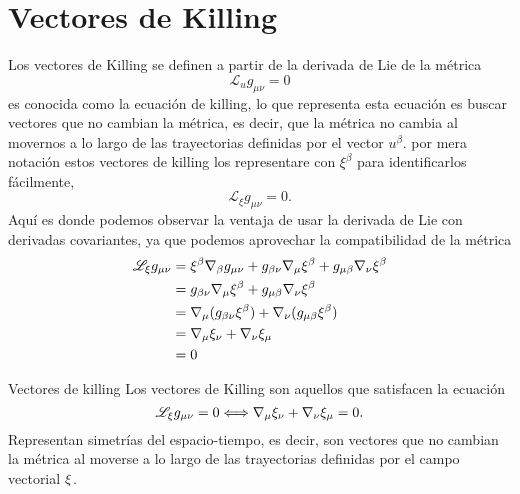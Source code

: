 \section{Vectores de Killing}
\noindent Los vectores de Killing se definen a partir de la derivada de Lie de la métrica
\begin{equation}
    \mathscr{L}_u g_{\mu \nu} =0
\end{equation}
es conocida como la ecuación de killing, lo que representa esta ecuación es buscar vectores que no cambian la métrica, es decir, que la métrica no cambia al movernos a lo largo de las trayectorias definidas por el vector $u^\beta$.
por mera notación estos vectores de killing los representare con $\xi ^\beta$ para identificarlos fácilmente,
\begin{equation}
    \mathscr{L}_\xi g_{\mu \nu} =0.
\end{equation}
Aquí es donde podemos observar la ventaja de usar la derivada de Lie con derivadas covariantes, ya que podemos aprovechar la compatibilidad de la métrica
\begin{equation}
    \begin{aligned}
        \mathscr{L}_\xi g_{\mu \nu} &= \xi^\beta \mathbf{\nabla}_\beta g_{\mu \nu} +g_{\beta \nu}\mathbf{\nabla}_\mu \xi^\beta +g_{\mu \beta } \mathbf{\nabla}_\nu \xi^\beta \\
        &= g_{\beta \nu}\mathbf{\nabla}_\mu \xi^\beta +g_{\mu \beta } \mathbf{\nabla}_\nu \xi^\beta                                                                             \\
        &= \mathbf{\nabla}_\mu (g_{\beta \nu} \xi^\beta) + \mathbf{\nabla}_\nu (g_{\mu \beta } \xi^\beta)                                                                       \\
        &= \mathbf{\nabla}_\mu  \xi_\nu + \mathbf{\nabla}_\nu \xi_\mu\\
        & =0             \\
    \end{aligned}
\end{equation}
\begin{definition}{Vectores de killing}{}
    Los vectores de Killing son aquellos que satisfacen la ecuación
    \begin{equation}
        \mathscr{L}_\xi g_{\mu \nu} =0   \Longleftrightarrow   \mathbf{\nabla}_\mu  \xi_\nu + \mathbf{\nabla}_\nu \xi_\mu
        =0      .
        \label{eq:killing}
    \end{equation}
    Representan simetrías del espacio-tiempo, es decir, son vectores que no cambian la métrica al moverse a lo largo de las trayectorias definidas por el campo vectorial $\mathbf{\xi}$.
    
\end{definition}

